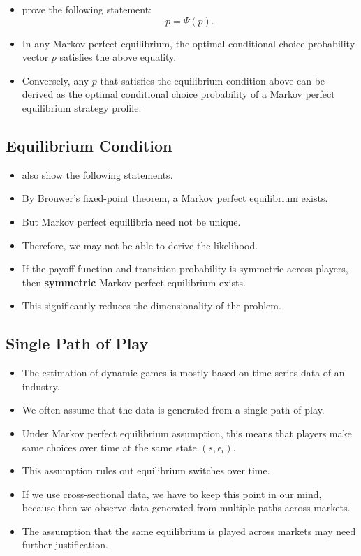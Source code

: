 \documentclass[
]{book}
\providecommand{\tightlist}{%
  \setlength{\itemsep}{0pt}\setlength{\parskip}{0pt}}
\begin{document}
\begin{itemize}
\tightlist
\item
  \citet{pesendorferAsymptoticLeastSquares2008} prove the following statement:
  \begin{equation}
  p = \Psi(p).
  \end{equation}
\item
  In any Markov perfect equilibrium, the optimal conditional choice probability vector \(p\) satisfies the above equality.
\item
  Conversely, any \(p\) that satisfies the equilibrium condition above can be derived as the optimal conditional choice probability of a Markov perfect equilibrium strategy profile.
\end{itemize}

\hypertarget{equilibrium-condition-1}{%
\subsection{Equilibrium Condition}\label{equilibrium-condition-1}}

\begin{itemize}
\tightlist
\item
  \citet{pesendorferAsymptoticLeastSquares2008} also show the following statements.
\item
  By Brouwer's fixed-point theorem, a Markov perfect equilibrium exists.
\item
  But Markov perfect equillibria need not be unique.
\item
  Therefore, we may not be able to derive the likelihood.
\item
  If the payoff function and transition probability is symmetric across players, then \textbf{symmetric} Markov perfect equilibrium exists.
\item
  This significantly reduces the dimensionality of the problem.
\end{itemize}

\hypertarget{single-path-of-play}{%
\subsection{Single Path of Play}\label{single-path-of-play}}

\begin{itemize}
\tightlist
\item
  The estimation of dynamic games is mostly based on time series data of an industry.
\item
  We often assume that the data is generated from a single path of play.
\item
  Under Markov perfect equilibrium assumption, this means that players make same choices over time at the same state \((s, \epsilon_i)\).
\item
  This assumption rules out equilibrium switches over time.
\item
  If we use cross-sectional data, we have to keep this point in our mind, because then we observe data generated from multiple paths across markets.
\item
  The assumption that the same equilibrium is played across markets may need further justification.
\end{itemize}
\end{document}

